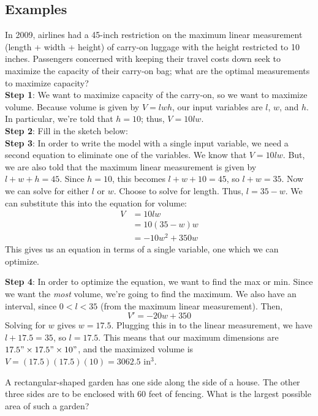\documentclass[notes]{subfiles}
\begin{document}
	\subsection*{Examples}
		\begin{ex}
			 In 2009, airlines had a 45-inch restriction on the maximum linear measurement (length + width + height) of carry-on luggage with the height restricted to 10 inches.  Passengers concerned with keeping their travel costs down seek to maximize the capacity of their carry-on bag; what are the optimal measurements to maximize capacity?\\

				\textbf{Step 1}: We want to maximize capacity of the carry-on, so we want to maximize volume.  Because volume is given by $V = lwh$, our input variables are $l$, $w$, and $h$.  In particular, we're told that $h = 10$; thus, $V = 10lw$.  \\
				\textbf{Step 2}: Fill in the sketch below:
					\\
				\textbf{Step 3}: In order to write the model with a single input variable, we need a second equation to eliminate one of the variables.  We know that $V = 10lw$.  But, we are also told that the maximum linear measurement is given by $l + w + h = 45$.  Since $h = 10$, this becomes $l + w + 10 = 45$, so $l + w = 35$.  Now we can solve for either $l$ or $w$.  Choose to solve for length.  Thus, $l = 35 - w$.  We can substitute this into the equation for volume:
					\begin{align*}
						V &= 10lw \\
						  &= 10(35 - w)w\\
						  &= -10w^2 + 350w
					\end{align*}
			This gives us an equation in terms of a single variable, one which we can optimize.
				\newpage
				
				\textbf{Step 4}: In order to optimize the equation, we want to find the max or min.  Since we want the \emph{most} volume, we're going to find the maximum.  We also have an interval, since $0 < l < 35$ (from the maximum linear measurement).  Then,
					\[V' = -20w + 350\]
					Solving for $w$ gives $w = 17.5$.  Plugging this in to the linear measurement, we have $l + 17.5 = 35$, so $l = 17.5$.  This means that our maximum dimensions are $17.5"\times17.5"\times10"$, and the maximized volume is $V = (17.5)(17.5)(10) = 3062.5$ in$^3$.
		\end{ex}
		\vs{.5}
			
		\begin{ex}
			A rectangular-shaped garden has one side along the side of a house.  The other three sides are to be enclosed with 60 feet of fencing.  What is the largest possible area of such a garden?
		\end{ex}
			\newpage
			
\end{document}
